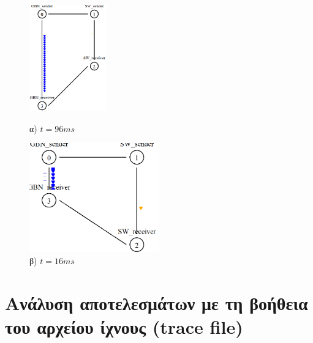 \documentclass{article}%
\begin{document}
\begin{itemize}
\begin{figure}[htbp]
\centering
\begin{minipage}{0.49\textwidth}
\centering
\includegraphics[width=0.30\textwidth]{2.png}
\caption{α) $t=96ms$}
\end{minipage}\hfill
\begin{minipage}{0.49\textwidth}
\centering
\includegraphics[width=0.50\textwidth]{3.png}
\caption{β) $t=16ms$}
\end{minipage}
\end{figure}


\end{itemize}

\section{Ανάλυση αποτελεσμάτων με τη βοήθεια του αρχείου ίχνους (\textlatin{trace file})}
\end{document}
